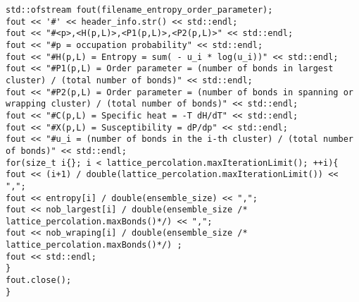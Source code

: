 \begin{lstlisting}[style=CStyle]
std::ofstream fout(filename_entropy_order_parameter);
fout << '#' << header_info.str() << std::endl;
fout << "#<p>,<H(p,L)>,<P1(p,L)>,<P2(p,L)>" << std::endl;
fout << "#p = occupation probability" << std::endl;
fout << "#H(p,L) = Entropy = sum( - u_i * log(u_i))" << std::endl;
fout << "#P1(p,L) = Order parameter = (number of bonds in largest cluster) / (total number of bonds)" << std::endl;
fout << "#P2(p,L) = Order parameter = (number of bonds in spanning or wrapping cluster) / (total number of bonds)" << std::endl;
fout << "#C(p,L) = Specific heat = -T dH/dT" << std::endl;
fout << "#X(p,L) = Susceptibility = dP/dp" << std::endl;
fout << "#u_i = (number of bonds in the i-th cluster) / (total number of bonds)" << std::endl;
for(size_t i{}; i < lattice_percolation.maxIterationLimit(); ++i){
fout << (i+1) / double(lattice_percolation.maxIterationLimit()) << ",";
fout << entropy[i] / double(ensemble_size) << ",";
fout << nob_largest[i] / double(ensemble_size /* lattice_percolation.maxBonds()*/) << ",";
fout << nob_wraping[i] / double(ensemble_size /* lattice_percolation.maxBonds()*/) ;
fout << std::endl;
}
fout.close();
}
\end{lstlisting}